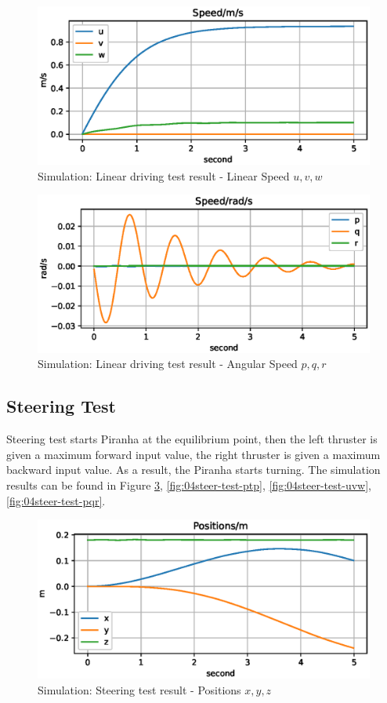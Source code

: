 \begin{figure}[H]
    \centering
    \includegraphics[width=.8\textwidth]{images/04linear-test-uvw.eps}
    \caption{Simulation: Linear driving test result - Linear Speed $u, v, w$}
    \label{fig:04linear-test-uvw}
\end{figure}

\begin{figure}[H]
    \centering
    \includegraphics[width=.8\textwidth]{images/04linear-test-pqr.eps}
    \caption{Simulation: Linear driving test result - Angular Speed $p, q, r$}
    \label{fig:04linear-test-pqr}
\end{figure}

\subsection{Steering Test}

Steering test starts Piranha at the equilibrium point, then the left thruster is given a maximum forward input value, the right thruster is given a maximum backward input value. As a result, the Piranha starts turning. The simulation results can be found in Figure \ref{fig:04steer-test-xyz}, \ref{fig:04steer-test-ptp}, \ref{fig:04steer-test-uvw}, \ref{fig:04steer-test-pqr}.

\begin{figure}[H]
    \centering
    \includegraphics[width=.8\textwidth]{images/04steer-test-xyz.eps}
    \caption{Simulation: Steering test result - Positions $x, y,z$}
    \label{fig:04steer-test-xyz}
\end{figure}

